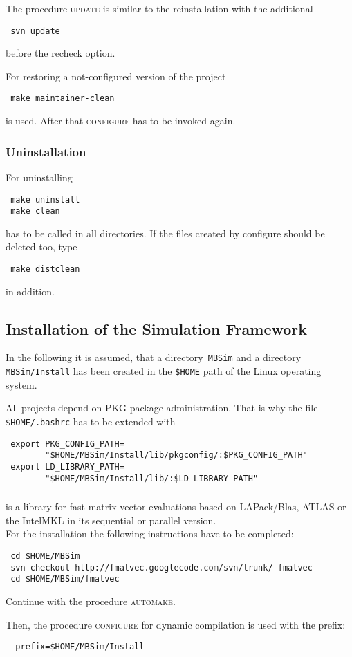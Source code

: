 The procedure \textsc{update} is similar to the reinstallation with the additional 
\begin{verbatim} 
 svn update 
\end{verbatim}
before the recheck option.\par

For restoring a not-configured version of the project
\begin{verbatim}
 make maintainer-clean
\end{verbatim}
is used. After that \textsc{configure} has to be invoked again.

\subsubsection{Uninstallation}
For uninstalling
\begin{verbatim}
 make uninstall
 make clean
\end{verbatim}
has to be called in all directories. If the files created by configure should be deleted too, type 
\begin{verbatim} 
 make distclean 
\end{verbatim} 
in addition.

\subsection{Installation of the Simulation Framework\label{sec:install:simulation}}
In the following it is assumed, that a directory~\texttt{MBSim} and a directory \texttt{MBSim/Install} has been created in the \texttt{\$HOME} path of the Linux operating system.\par
All projects depend on PKG package administration. That is why the file \texttt{\$HOME/.bashrc} has to be extended with
\begin{verbatim}
 export PKG_CONFIG_PATH=
        "$HOME/MBSim/Install/lib/pkgconfig/:$PKG_CONFIG_PATH"
 export LD_LIBRARY_PATH=
        "$HOME/MBSim/Install/lib/:$LD_LIBRARY_PATH"
\end{verbatim}

\subsubsection{\FMatVec{}}
\FMatVec{} is a library for fast matrix-vector evaluations based on LAPack/Blas, ATLAS or the IntelMKL in its sequential or parallel version.\\
For the installation the following instructions have to be completed:
\begin{verbatim}
 cd $HOME/MBSim
 svn checkout http://fmatvec.googlecode.com/svn/trunk/ fmatvec
 cd $HOME/MBSim/fmatvec
\end{verbatim}
Continue with the procedure \textsc{automake}.\par
Then, the procedure \textsc{configure} for dynamic compilation is used with the prefix:
\begin{verbatim}
--prefix=$HOME/MBSim/Install
\end{verbatim}

